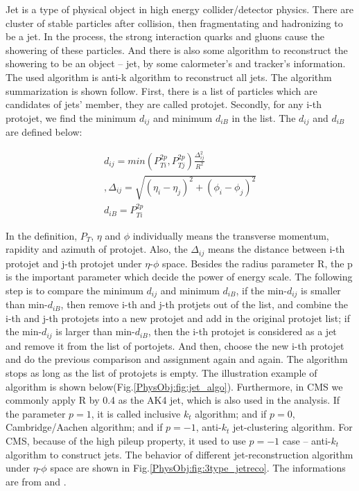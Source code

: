 
		Jet is a type of physical object in high energy collider/detector physics. There are cluster of stable particles after collision, then fragmentating and hadronizing to be a jet. In the process, the strong interaction quarks and gluons cause the showering of these particles. And there is also some algorithm to reconstruct the showering to be an object -- jet, by some calormeter's and tracker's information.
		The used algorithm is anti-k algorithm to reconstruct all jets. The algorithm summarization is shown follow. First, there is a list of particles which are candidates of jets' member, they are called protojet. Secondly, for any i-th protojet, we find the minimum $d_{ij}$ and minimum $d_{iB}$ in the list. The $d_{ij}$ and $d_{iB}$ are defined below:

		\begin{equation}
		\begin{split}
		d_{ij} = min(P_{Ti}^{2p}, P_{Tj}^{2p}) \frac{\Delta_{ij}^2}{R^2}\\
		, \Delta_{ij} = \sqrt{ (\eta_i - \eta_j)^2 + (\phi_i - \phi_j)^2 }\\
		d_{iB} = P_{Ti}^{2p}
		\end{split}
		\label{eq:jet_reco_algo}
		\end{equation}
		\FloatBarrier

		In the definition, $P_{T}$, $\eta$ and $\phi$ individually means the transverse momentum, rapidity and azimuth of protojet. Also, the $\Delta_{ij}$ means the distance between i-th protojet and j-th protojet under $\eta$-$\phi$ space. Besides the radius parameter R, the p is the important parameter which decide the power of energy scale. The following step is to compare the minimum $d_{ij}$ and minimum $d_{iB}$, if the min-$d_{ij}$ is smaller than min-$d_{iB}$, then remove i-th and j-th protjets out of the list, and combine the i-th and j-th protojets into a new protojet and add in the original protojet list; if the min-$d_{ij}$ is larger than min-$d_{iB}$, then the i-th protojet is considered as a jet and remove it from the list of portojets. And then, choose the new i-th protojet and do the previous comparison and assignment again and again. The algorithm stops as long as the list of protojets is empty. The illustration example of algorithm is shown below(Fig.\ref{PhysObj:fig:jet_algo}). Furthermore, in CMS we commonly apply R by 0.4 as the AK4 jet, which is also used in the analysis. If the parameter $p=1$, it is called inclusive $k_{t}$ algorithm; and if $p=0$, Cambridge/Aachen algorithm; and if $p=-1$, anti-$k_{t}$ jet-clustering algorithm. For CMS, because of the high pileup property, it used to use $p=-1$ case -- anti-$k_{t}$ algorithm to construct jets. The behavior of different jet-reconstruction algorithm under $\eta$-$\phi$ space are shown in Fig.\ref{PhysObj:fig:3type_jetreco}. The informations are from \cite{Atkin_2015} and \cite{Cacciari_2008}.

